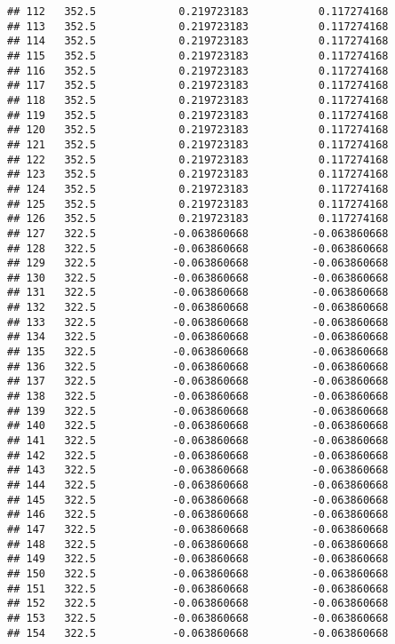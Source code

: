 \documentclass[]{article}
\begin{document}
\begin{verbatim}
## 112   352.5             0.219723183           0.117274168
## 113   352.5             0.219723183           0.117274168
## 114   352.5             0.219723183           0.117274168
## 115   352.5             0.219723183           0.117274168
## 116   352.5             0.219723183           0.117274168
## 117   352.5             0.219723183           0.117274168
## 118   352.5             0.219723183           0.117274168
## 119   352.5             0.219723183           0.117274168
## 120   352.5             0.219723183           0.117274168
## 121   352.5             0.219723183           0.117274168
## 122   352.5             0.219723183           0.117274168
## 123   352.5             0.219723183           0.117274168
## 124   352.5             0.219723183           0.117274168
## 125   352.5             0.219723183           0.117274168
## 126   352.5             0.219723183           0.117274168
## 127   322.5            -0.063860668          -0.063860668
## 128   322.5            -0.063860668          -0.063860668
## 129   322.5            -0.063860668          -0.063860668
## 130   322.5            -0.063860668          -0.063860668
## 131   322.5            -0.063860668          -0.063860668
## 132   322.5            -0.063860668          -0.063860668
## 133   322.5            -0.063860668          -0.063860668
## 134   322.5            -0.063860668          -0.063860668
## 135   322.5            -0.063860668          -0.063860668
## 136   322.5            -0.063860668          -0.063860668
## 137   322.5            -0.063860668          -0.063860668
## 138   322.5            -0.063860668          -0.063860668
## 139   322.5            -0.063860668          -0.063860668
## 140   322.5            -0.063860668          -0.063860668
## 141   322.5            -0.063860668          -0.063860668
## 142   322.5            -0.063860668          -0.063860668
## 143   322.5            -0.063860668          -0.063860668
## 144   322.5            -0.063860668          -0.063860668
## 145   322.5            -0.063860668          -0.063860668
## 146   322.5            -0.063860668          -0.063860668
## 147   322.5            -0.063860668          -0.063860668
## 148   322.5            -0.063860668          -0.063860668
## 149   322.5            -0.063860668          -0.063860668
## 150   322.5            -0.063860668          -0.063860668
## 151   322.5            -0.063860668          -0.063860668
## 152   322.5            -0.063860668          -0.063860668
## 153   322.5            -0.063860668          -0.063860668
## 154   322.5            -0.063860668          -0.063860668

\end{verbatim}
\end{document}
